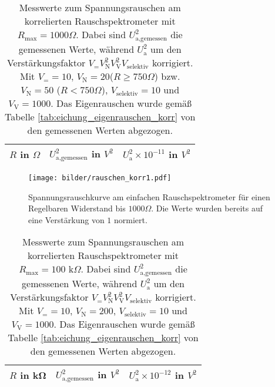 		\begin{table}[h]
			\centering
			\begin{tabular}{ccc}
				\toprule \midrule
				$R$ in $\Omega$ & $U_\text{a,gemessen}^2$ in $V^2$
				& $U_\text{a}^2 \times 10^{-11}$ in $V^2$\\
				\midrule
				
				\midrule \bottomrule
			\end{tabular}
			\caption{Messwerte zum Spannungsrauschen am korrelierten
			Rauschspektrometer mit $R_\text{max}=1000 \Omega$. Dabei sind
			$U_\text{a,gemessen}^2$ die gemessenen Werte, während $U_\text{a}^2$ um den
			Verstärkungsfaktor $V_= V_\text{N}^2 V_\text{V}^2 V_\text{selektiv}$ korrigiert.
			Mit $V_= =10$, $V_\text{N}=20$($R\geq 750\Omega$) bzw. $V_\text{N}=50$
			($R<750\Omega$), $V_\text{selektiv}=10$ und $V_\text{V}=1000$. 
			Das Eigenrauschen wurde gemäß Tabelle 
			\ref{tab:eichung_eigenrauschen_korr} von den gemessenen Werten 
			abgezogen.}
			\label{tab:rauschen_korr1}
	\end{table}

	\begin{figure}[h]
			\centering
			\texttt{[image: bilder/rauschen\_korr1.pdf]}
			\caption{Spannungsrauschkurve am einfachen Rauschspektrometer für einen
			Regelbaren Widerstand bis $1000\Omega$. Die Werte wurden bereits auf eine Verstärkung von
			$1$ normiert.}
			\label{fig:rauschen_korr1}
	\end{figure}



	\begin{table}[h]
			\centering
			\begin{tabular}{ccc}
				\toprule \midrule
				$R$ in \si{\kilo\ohm} & $U_\text{a,gemessen}^2$ in $V^2$
				&$U_\text{a}^2 \times 10^{-12}$ in $V^2$ \\
				\midrule
				
				\midrule \bottomrule
			\end{tabular}
			\caption{Messwerte zum Spannungsrauschen am korrelierten
			Rauschspektrometer mit $R_\text{max}=100 \text{ k}\Omega$. Dabei sind
			$U_\text{a,gemessen}^2$ die gemessenen Werte, während $U_\text{a}^2$ um den
			Verstärkungsfaktor $V_= V_\text{N}^2 V_\text{V}^2 V_\text{selektiv}$ korrigiert.
			Mit $V_= =10$, $V_\text{N}=200$, $V_\text{selektiv}=10$ und $V_\text{V}=1000$. Das Eigenrauschen wurde gemäß Tabelle 
			\ref{tab:eichung_eigenrauschen_korr} von den gemessenen Werten 
			abgezogen. }
			\label{tab:rauschen_korr2}
	\end{table}

